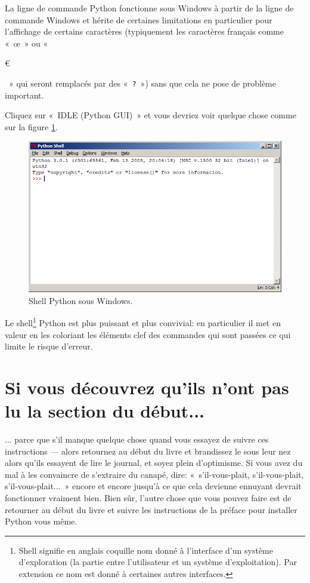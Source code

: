 La ligne de commande Python fonctionne sous Windows à partir de la ligne de commande Windows et hérite de certaines limitations en particulier pour l'affichage de certains caractères (typiquement les caractères français comme «~œ~» ou  «~\begin{small}\euro\end{small}~» qui seront remplacés par des «~\texttt{?}~») sans que cela ne pose de problème important.

Cliquez sur «~IDLE (Python GUI)~» et vous devriez voir quelque chose comme sur la figure \ref{fig:shell}.

\begin{figure}[h!]
\centering
\includegraphics[scale=0.6]{images/shell}
\caption{Shell Python sous Windows.}\label{fig:shell}
\end{figure}

Le shell\footnote{Shell signifie en anglais coquille nom donné à l'interface d'un système d'exploration (la partie entre l'utilisateur et un système d'exploitation). Par extension ce nom est donné à certaines autres interfaces.} Python est plus puissant et plus convivial: en particulier il met en valeur en les coloriant les éléments clef des commandes qui sont passées ce qui limite le risque d'erreur.

\section*{Si vous découvrez qu'ils n'ont pas lu la section du début...}

... parce que s'il manque quelque chose quand vous essayez de suivre ces instructions --- alors retournez au début du livre et brandissez le sous leur nez alors qu'ils essayent de lire le journal, et soyez plein d'optimisme. Si vous avez du mal à les convaincre de s'extraire du canapé, dire: «~s'il-vous-plait, s'il-vous-plait, s'il-vous-plait...~» encore et encore jusqu'à ce que cela devienne ennuyant devrait fonctionner vraiment bien. Bien sûr, l'autre chose que vous pouvez faire est de retourner au début du livre et suivre les instructions de la préface pour installer Python vous même.

